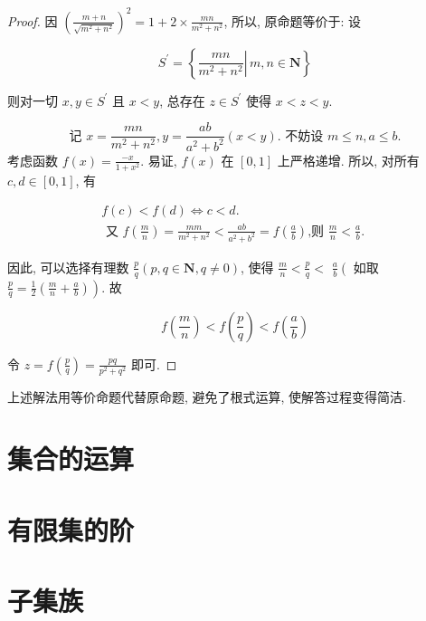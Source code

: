 \begin{proof}
	因 $\left(\frac{m+n}{\sqrt{m^{2}+n^{2}}}\right)^{2}=1+2 \times \frac{m n}{m^{2}+n^{2}}$, 所以, 原命题等价于: 设

	$$
		S^{\prime}=\left\{\left.\frac{m n}{m^{2}+n^{2}} \right\rvert\, m, n \in \mathbf{N}\right\}
	$$

	则对一切 $x, y \in S^{\prime}$ 且 $x<y$, 总存在 $z \in S^{\prime}$ 使得 $x<z<y$.

	$$
		\text { 记 } x=\frac{m n}{m^{2}+n^{2}}, y=\frac{a b}{a^{2}+b^{2}}(x<y) \text {. 不妨设 } m \leqslant n, a \leqslant b \text {. }
	$$
	考虑函数 $f(x)=\frac{-x}{1+x^{2}}$. 易证, $f(x)$ 在 $[0,1]$ 上严格递增. 所以, 对所有 $c, d \in[0,1]$, 有

	$$
		\begin{gathered}
			f(c)<f(d) \Leftrightarrow c<d . \\
			\text { 又 } f\left(\frac{m}{n}\right)=\frac{m m}{m^{2}+n^{2}}<\frac{a b}{a^{2}+b^{2}}=f\left(\frac{a}{b}\right) \text {,则 } \frac{m}{n}<\frac{a}{b} \text {. }
		\end{gathered}
	$$

	因此, 可以选择有理数 $\frac{p}{q}(p, q \in \mathbf{N}, q \neq 0)$, 使得 $\frac{m}{n}<\frac{p}{q}<$ $\frac{a}{b}\left(\right.$ 如取 $\left.\frac{p}{q}=\frac{1}{2}\left(\frac{m}{n}+\frac{a}{b}\right)\right)$. 故

	$$
		f\left(\frac{m}{n}\right)<f\left(\frac{p}{q}\right)<f\left(\frac{a}{b}\right)
	$$

	令 $z=f\left(\frac{p}{q}\right)=\frac{p q}{p^{2}+q^{2}}$ 即可.
\end{proof}

\begin{note}
	上述解法用等价命题代替原命题, 避免了根式运算, 使解答过程变得简洁.
\end{note}















\section{集合的运算}
\section{有限集的阶}
\section{子集族}
